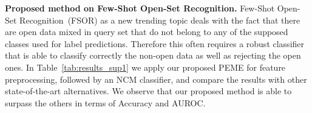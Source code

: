 \documentclass[review]{elsarticle}
\begin{document}
\textbf{Proposed method on Few-Shot Open-Set Recognition.} Few-Shot Open-Set Recognition~(FSOR) as a new trending topic deals with the fact that there are open data mixed in query set  that do not belong to any of the supposed classes used for label predictions. Therefore this often requires a robust classifier that is able to classify correctly the non-open data as well as rejecting the open ones. In Table~\ref{tab:results_sup1} we apply our proposed PEME for feature preprocessing, followed by an NCM classifier, and compare the results with other state-of-the-art alternatives. We observe that our proposed method is able to surpass the others in terms of Accuracy and AUROC.

\begin{table}[h]
    \caption{Accuracy and AUROC of Proposed method for Few-Shot Open-Set Recognition.}
    \centering
    \label{tab:results_sup1}
\end{table}
\end{document}
